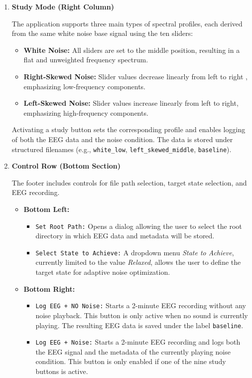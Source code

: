 \begin{enumerate}
\item \textbf{Study Mode (Right Column)}

The application supports three main types of spectral profiles, each derived from the same white noise base signal using the ten sliders:

\begin{itemize}
\item \textbf{White Noise:} All sliders are set to the middle position, resulting in a flat and unweighted frequency spectrum.
\item \textbf{Right-Skewed Noise:} Slider values decrease linearly from left to right , emphasizing low-frequency components.
\item \textbf{Left-Skewed Noise:} Slider values increase linearly from left to right, emphasizing high-frequency components.
\end{itemize}

Activating a study button sets the corresponding profile and enables logging of both the EEG data and the noise condition. The data is stored under structured filenames (e.g., \texttt{white\_low}, \texttt{left\_skewed\_middle}, \texttt{baseline}). \\

\item \textbf{Control Row (Bottom Section)}

The footer includes controls for file path selection, target state selection, and EEG recording.

\begin{itemize}
\item \textbf{Bottom Left:}
  \begin{itemize}
    \item \texttt{Set Root Path:} Opens a dialog allowing the user to select the root directory in which EEG data and metadata will be stored.
    \item \texttt{Select State to Achieve:} A dropdown menu \textit{State to Achieve}, currently limited to the value \textit{Relaxed}, allows the user to define the target state for adaptive noise optimization.
  \end{itemize}

\item \textbf{Bottom Right:}
  \begin{itemize}
    \item \texttt{Log EEG + NO Noise:} Starts a 2-minute EEG recording without any noise playback. This button is only active when no sound is currently playing. The resulting EEG data is saved under the label \texttt{baseline}.
    \item \texttt{Log EEG + Noise:} Starts a 2-minute EEG recording and logs both the EEG signal and the metadata of the currently playing noise condition. This button is only enabled if one of the nine study buttons is active.
  \end{itemize}
\end{itemize}

\end{enumerate}






